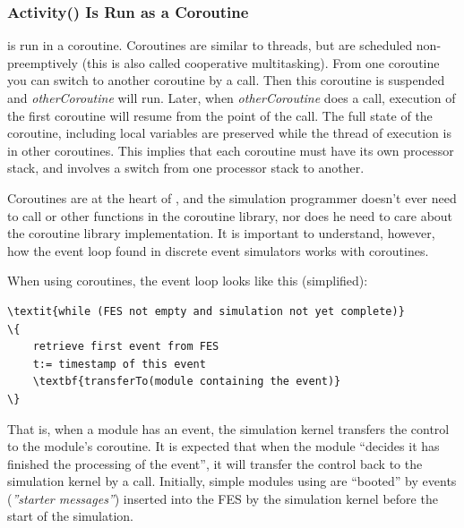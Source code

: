 \subsubsection{Activity() Is Run as a Coroutine}


 is run in a coroutine.
Coroutines are similar to threads, but are scheduled
non-preemptively (this is also called cooperative
multitasking). From one coroutine you
can switch to another coroutine by a
 call. Then this
coroutine is suspended and \textit{otherCoroutine} will run. Later,
when \textit{otherCoroutine} does a
 call, execution of
the first coroutine will resume from the point of the
 call.  The full state
of the coroutine, including local variables are preserved while the
thread of execution is in other coroutines.  This implies that each
coroutine must have its own processor stack, and
 involves a switch from one processor stack to
another.


Coroutines are at the heart of {\opp}, and the
simulation programmer doesn't ever need to call 
or other functions in the coroutine library, nor does he need to care
about the coroutine library implementation. It is important to
understand, however, how the event loop found in discrete event simulators
works with coroutines.


When using coroutines, the event loop looks like
this (simplified):


\begin{Verbatim}[commandchars=\\\{\}]
\textit{while (FES not empty and simulation not yet complete)}
\{
    retrieve first event from FES
    t:= timestamp of this event
    \textbf{transferTo(module containing the event)}
\}
\end{Verbatim}



That is, when a module has an event, the simulation
kernel transfers the control to the module's coroutine. It is expected
that when the module ``decides it has finished the processing of the
event'', it will transfer the control back to the simulation kernel by
a  call. Initially,
simple modules using  are
``booted'' by events (\textit{''starter messages''})
inserted into the FES by the simulation kernel before the
start of the simulation.


